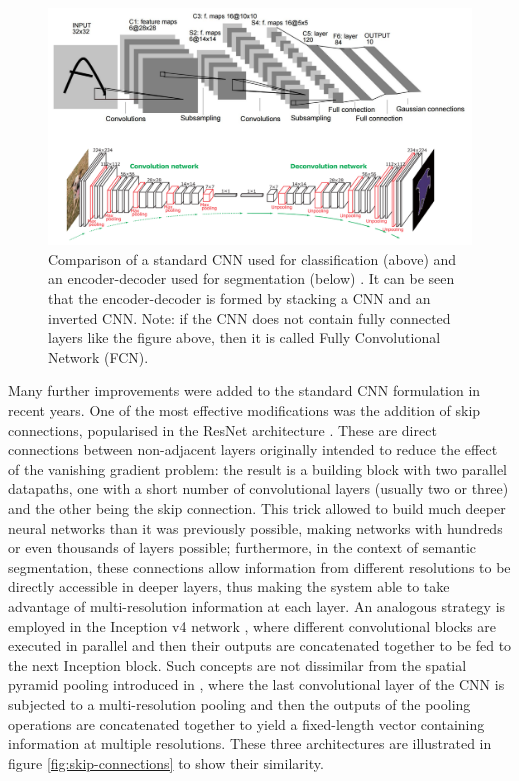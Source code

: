 \documentclass[12pt,twoside]{report}
\begin{document}
\begin{figure}[ht]%
\centering
\includegraphics[width = 1\hsize]{./figures/cnn-ed}
\caption{Comparison of a standard CNN used for classification (above) \cite{cnn} and an encoder-decoder used for segmentation (below) \cite{encdec}. It can be seen that the encoder-decoder is formed by stacking a CNN and an inverted CNN. Note: if the CNN does not contain fully connected layers like the figure above, then it is called Fully Convolutional Network (FCN).}
\label{fig:cnn-ed}
\end{figure}

Many further improvements were added to the standard CNN formulation in recent years. One of the most effective modifications was the addition of skip connections, popularised in the ResNet architecture \cite{resnet}. These are direct connections between non-adjacent layers originally intended to reduce the effect of the vanishing gradient problem: the result is a building block with two parallel datapaths, one with a short number of convolutional layers (usually two or three) and the other being the skip connection. This trick allowed to build much deeper neural networks than it was previously possible, making networks with hundreds or even thousands of layers possible; furthermore, in the context of semantic segmentation, these connections allow information from different resolutions to be directly accessible in deeper layers, thus making the system able to take advantage of multi-resolution information at each layer. An analogous strategy is employed in the Inception v4 network \cite{inceptionv4}, where different convolutional blocks are executed in parallel and then their outputs are concatenated together to be fed to the next Inception block. Such concepts are not dissimilar from the spatial pyramid pooling introduced in \cite{spp}, where the last convolutional layer of the CNN is subjected to a multi-resolution pooling and then the outputs of the pooling operations are concatenated together to yield a fixed-length vector containing information at multiple resolutions. These three architectures are illustrated in figure \ref{fig:skip-connections} to show their similarity.
\\
\end{document}
